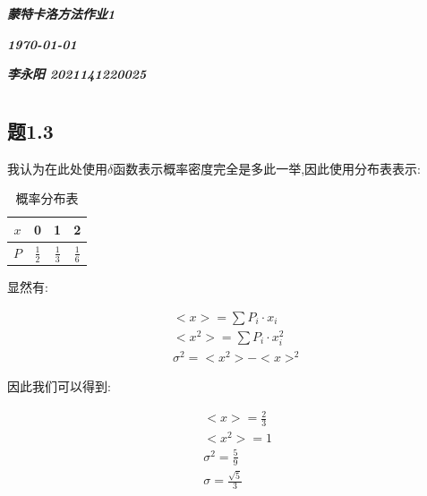 \documentclass{article}
\begin{document}
	
	\thispagestyle{fancy}
	\begin{center}
		\textbf{{\fontsize{15}{14}\itshape\selectfont
				蒙特卡洛方法\quad 作业1 }}
		\vspace{2em}
		
		\textbf{{\fontsize{15}{14}\itshape\selectfont
				\today{}
		}}
		\vspace{2em}
									
		\textbf{{\fontsize{15}{14}\itshape\selectfont 李永阳 2021141220025 }}
	\end{center}	
	
	
	\section{}
	\subsection*{题1.3}
	\quad 
	
	我认为在此处使用$\delta$函数表示概率密度完全是多此一举,因此使用分布表表示:
	
	\begin{table}[ht]
	\centering
	\caption{概率分布表}
	\begin{tabular}{|c | c|c|c|}
		\hline
		$x$ & 0 & 1 & 2\\
		\hline
		$P$ & $\frac{1}{2}$ & $\frac{1}{3}$ & $\frac{1}{6}$ \\
		\hline
	\end{tabular}
	\end{table}
	
	显然有:
	
	\begin{equation*}
		\begin{split}
			&<x>=\sum P_i\cdot x_i\\
			&<x^2>=\sum P_i\cdot x_i^2\\
			&\sigma^2 = <x^2> - <x>^2
		\end{split}
	\end{equation*}

	因此我们可以得到:
	
	\begin{equation*}
		\begin{split}
			&<x>=\frac{2}{3}\\
			&<x^2>=1\\
			&\sigma^2=\frac{5}{9}\\
			&\sigma=\frac{\sqrt{5}}{3}
		\end{split}
	\end{equation*}
	
\end{document}
